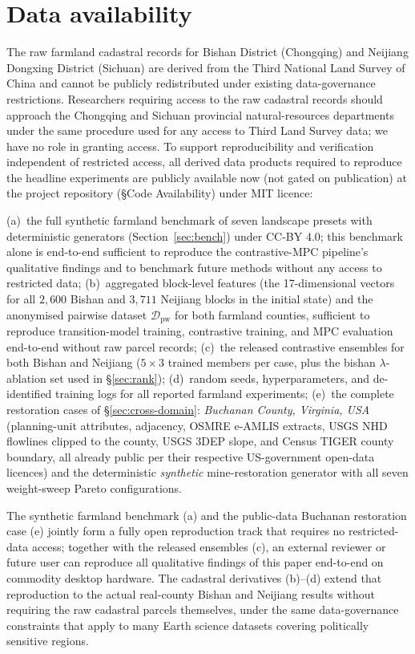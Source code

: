 \documentclass[11pt]{article}
\begin{document}
\section*{Data availability}
The raw farmland cadastral records for Bishan District (Chongqing) and Neijiang Dongxing District (Sichuan) are derived from the Third National Land Survey of China and cannot be publicly redistributed under existing data-governance restrictions. Researchers requiring access to the raw cadastral records should approach the Chongqing and Sichuan provincial natural-resources departments under the same procedure used for any access to Third Land Survey data; we have no role in granting access. To support reproducibility and verification independent of restricted access, all derived data products required to reproduce the headline experiments are publicly available now (not gated on publication) at the project repository (\S Code Availability) under MIT licence:

(a)~the full synthetic farmland benchmark of seven landscape presets with deterministic generators (Section~\ref{sec:bench}) under CC-BY 4.0; this benchmark alone is end-to-end sufficient to reproduce the contrastive-MPC pipeline's qualitative findings and to benchmark future methods without any access to restricted data;
(b)~aggregated block-level features (the 17-dimensional vectors for all $2{,}600$ Bishan and $3{,}711$ Neijiang blocks in the initial state) and the anonymised pairwise dataset $\mathcal{D}_{\text{pw}}$ for both farmland counties, sufficient to reproduce transition-model training, contrastive training, and MPC evaluation end-to-end without raw parcel records;
(c)~the released contrastive ensembles for both Bishan and Neijiang ($5 \times 3$ trained members per case, plus the bishan $\lambda$-ablation set used in \S\ref{sec:rank});
(d)~random seeds, hyperparameters, and de-identified training logs for all reported farmland experiments;
(e)~the complete restoration cases of \S\ref{sec:cross-domain}: \emph{Buchanan County, Virginia, USA} (planning-unit attributes, adjacency, OSMRE e-AMLIS extracts, USGS NHD flowlines clipped to the county, USGS 3DEP slope, and Census TIGER county boundary, all already public per their respective US-government open-data licences) and the deterministic \emph{synthetic} mine-restoration generator with all seven weight-sweep Pareto configurations.

The synthetic farmland benchmark (a) and the public-data Buchanan restoration case (e) jointly form a fully open reproduction track that requires no restricted-data access; together with the released ensembles (c), an external reviewer or future user can reproduce all qualitative findings of this paper end-to-end on commodity desktop hardware. The cadastral derivatives (b)--(d) extend that reproduction to the actual real-county Bishan and Neijiang results without requiring the raw cadastral parcels themselves, under the same data-governance constraints that apply to many Earth science datasets covering politically sensitive regions.
\end{document}
